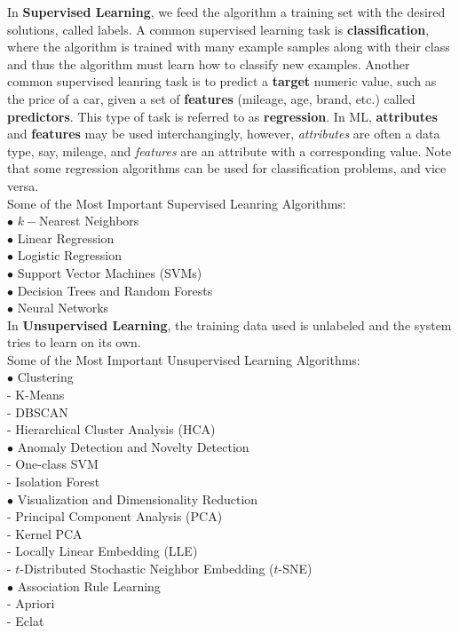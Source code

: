     \noindent In \textbf{Supervised Learning}, we feed the algorithm a training set with the desired solutions,
    called labels. A common supervised learning task is \textbf{classification}, where the algorithm is
    trained with many example samples along with their class and thus the algorithm must learn how to classify
    new examples. Another common supervised leanring task is to predict a \textbf{target} numeric value, such
    as the price of a car, given a set of \textbf{features} (mileage, age, brand, etc.) called
    \textbf{predictors}. This type of task is referred to as \textbf{regression}. In ML, \textbf{attributes}
    and \textbf{features} may be used interchangingly, however, \textit{attributes} are often a data type, say,
    mileage, and \textit{features} are an attribute with a corresponding value. Note that some regression
    algorithms can be used for classification problems, and vice versa. \\

    \noindent Some of the Most Important Supervised Leanring Algorithms: \\
    $\bullet$ $k-$Nearest Neighbors \\
    $\bullet$ Linear Regression \\
    $\bullet$ Logistic Regression \\
    $\bullet$ Support Vector Machines (SVMs) \\
    $\bullet$ Decision Trees and Random Forests \\
    $\bullet$ Neural Networks \\

    \noindent In \textbf{Unsupervised Learning}, the training data used is unlabeled and the system tries to
    learn on its own. \\

    \noindent Some of the Most Important Unsupervised Learning Algorithms: \\
    $\bullet$ Clustering \\
    - K-Means \\
    - DBSCAN \\
    - Hierarchical Cluster Analysis (HCA) \\
    $\bullet$ Anomaly Detection and Novelty Detection \\
    - One-class SVM \\
    - Isolation Forest \\
    $\bullet$ Visualization and Dimensionality Reduction \\
    - Principal Component Analysis (PCA) \\
    - Kernel PCA \\
    - Locally Linear Embedding (LLE) \\
    - $t$-Distributed Stochastic Neighbor Embedding ($t$-SNE) \\
    $\bullet$ Association Rule Learning \\
    - Apriori \\
    - Eclat \\

